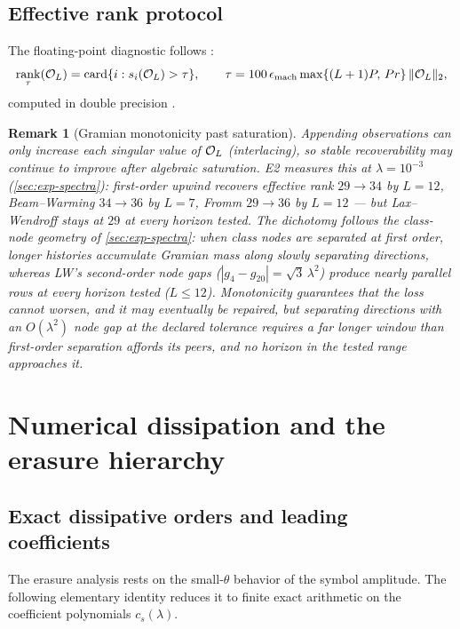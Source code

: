 \documentclass[pdflatex,sn-mathphys-num]{sn-jnl}%
\theoremstyle{thmstyleone}%
\theoremstyle{thmstyletwo}%
\newtheorem{remark}{Remark}%
\theoremstyle{thmstylethree}%
\newcommand{\epsmach}{\epsilon_{\rm mach}}
\DeclareMathOperator{\rank}{rank}
\DeclareMathOperator{\card}{card}
\newcommand{\OL}{{\cal O}_L}
\begin{document}
\subsection{Effective rank protocol}\label{sec:effective-rank}

The floating-point diagnostic follows \cite{PolemitisChristakisDrikakis2026FVerasure}: \[ \rank_\tau(\OL) = \card\{i:s_i(\OL)>\tau\}, \qquad \tau=100\,\epsmach\max\{(L+1)P,\,Pr\}\,\|\OL\|_2 , \] computed in double precision \cite{TrefethenBau1997,Higham2002}.

\begin{remark}[Gramian monotonicity past saturation]\label{rem:gramian}
Appending observations can only increase each singular value of $\OL$ (interlacing), so stable recoverability may continue to improve after algebraic saturation.
E2 measures this at $\lambda=10^{-3}$ (\cref{sec:exp-spectra}): first-order upwind recovers effective rank $29\to 34$ by $L=12$, Beam--Warming $34\to36$ by $L=7$, Fromm $29\to36$ by $L=12$ --- but Lax--Wendroff stays at $29$ at every horizon tested.
The dichotomy follows the class-node geometry of \cref{sec:exp-spectra}: when class nodes are separated at first order, longer histories accumulate Gramian mass along slowly separating directions, whereas LW's second-order node gaps ($|g_4-g_{20}|=\sqrt3\,\lambda^2$) produce nearly parallel rows at every horizon tested ($L\le12$).
Monotonicity guarantees that the loss cannot worsen, and it may eventually be repaired, but separating directions with an $O(\lambda^2)$ node gap at the declared tolerance requires a far longer window than first-order separation affords its peers, and no horizon in the tested range approaches it.
\end{remark}

\section{Numerical dissipation and the erasure hierarchy}\label{sec:erasure}

\subsection{Exact dissipative orders and leading coefficients}\label{sec:dissipation}

The erasure analysis rests on the small-$\theta$ behavior of the symbol amplitude.
The following elementary identity reduces it to finite exact arithmetic on the coefficient polynomials $c_s(\lambda)$.
\end{document}
